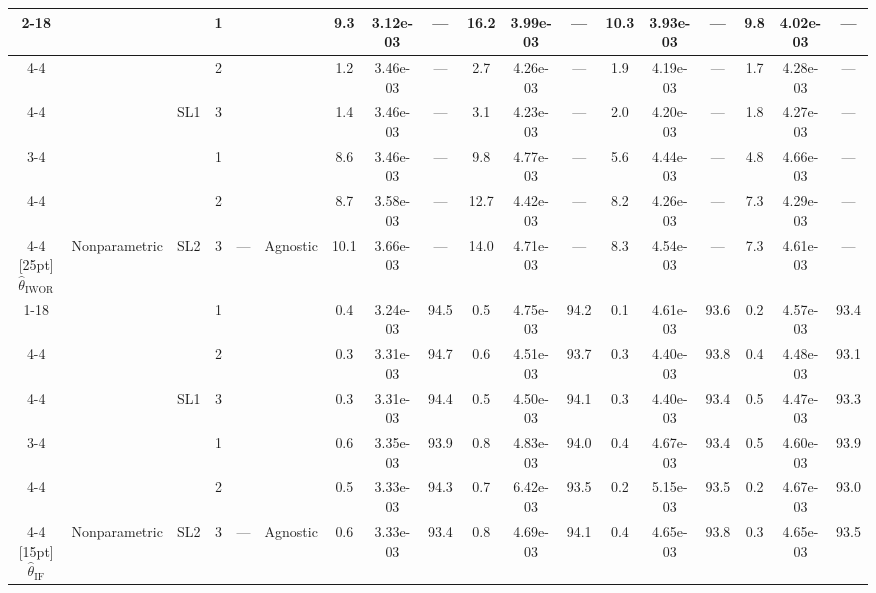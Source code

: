 \begin{table}
\begin{tabular}[t]{ccccccc@{}c@{}cc@{}c@{}cc@{}c@{}cc@{}c@{}c}
\cmidrule{2-18}
 &  &  &  1 &  &  & 9.3 & 3.12e-03 & --- & 16.2 & 3.99e-03 & --- & 10.3 & 3.93e-03 & --- & 9.8 & 4.02e-03 & ---\\
\cmidrule{4-4}
\cmidrule{7-18}
 &  &  &  2 &  &  & 1.2 & 3.46e-03 & --- & 2.7 & 4.26e-03 & --- & 1.9 & 4.19e-03 & --- & 1.7 & 4.28e-03 & ---\\
\cmidrule{4-4}
\cmidrule{7-18}
 &  & \multirow{-3}{*}[5pt]{\centering\arraybackslash SL1} &  3 &  &  & 1.4 & 3.46e-03 & --- & 3.1 & 4.23e-03 & --- & 2.0 & 4.20e-03 & --- & 1.8 & 4.27e-03 & ---\\
\cmidrule{3-4}
\cmidrule{7-18}
 &  &  &  1 &  &  & 8.6 & 3.46e-03 & --- & 9.8 & 4.77e-03 & --- & 5.6 & 4.44e-03 & --- & 4.8 & 4.66e-03 & ---\\
\cmidrule{4-4}
\cmidrule{7-18}
 &  &  &  2 &  &  & 8.7 & 3.58e-03 & --- & 12.7 & 4.42e-03 & --- & 8.2 & 4.26e-03 & --- & 7.3 & 4.29e-03 & ---\\
\cmidrule{4-4}
\cmidrule{7-18}
\multirow{-9}{*}[25pt]{\centering\arraybackslash $\widehat\theta_\text{IWOR}$} & \multirow{-6}{*}[15pt]{\centering\arraybackslash  Nonparametric} & \multirow{-3}{*}[5pt]{\centering\arraybackslash SL2} &  3 & \multirow{-6}{*}[15pt]{\centering\arraybackslash  ---} & \multirow{-6}{*}[15pt]{\centering\arraybackslash  Agnostic} & 10.1 & 3.66e-03 & --- & 14.0 & 4.71e-03 & --- & 8.3 & 4.54e-03 & --- & 7.3 & 4.61e-03 & ---\\
\cmidrule{1-18}
 &  &  &  1 &  &  & 0.4 & 3.24e-03 & 94.5 & 0.5 & 4.75e-03 & 94.2 & 0.1 & 4.61e-03 & 93.6 & 0.2 & 4.57e-03 & 93.4\\
\cmidrule{4-4}
\cmidrule{7-18}
 &  &  &  2 &  &  & 0.3 & 3.31e-03 & 94.7 & 0.6 & 4.51e-03 & 93.7 & 0.3 & 4.40e-03 & 93.8 & 0.4 & 4.48e-03 & 93.1\\
\cmidrule{4-4}
\cmidrule{7-18}
 &  & \multirow{-3}{*}[5pt]{\centering\arraybackslash SL1} &  3 &  &  & 0.3 & 3.31e-03 & 94.4 & 0.5 & 4.50e-03 & 94.1 & 0.3 & 4.40e-03 & 93.4 & 0.5 & 4.47e-03 & 93.3\\
\cmidrule{3-4}
\cmidrule{7-18}
 &  &  &  1 &  &  & 0.6 & 3.35e-03 & 93.9 & 0.8 & 4.83e-03 & 94.0 & 0.4 & 4.67e-03 & 93.4 & 0.5 & 4.60e-03 & 93.9\\
\cmidrule{4-4}
\cmidrule{7-18}
 &  &  &  2 &  &  & 0.5 & 3.33e-03 & 94.3 & 0.7 & 6.42e-03 & 93.5 & 0.2 & 5.15e-03 & 93.5 & 0.2 & 4.67e-03 & 93.0\\
\cmidrule{4-4}
\cmidrule{7-18}
\multirow{-6}{*}[15pt]{\centering\arraybackslash $\widehat\theta_\text{IF}$} & \multirow{-6}{*}[15pt]{\centering\arraybackslash  Nonparametric} & \multirow{-3}{*}[5pt]{\centering\arraybackslash SL2} &  3 & \multirow{-6}{*}[15pt]{\centering\arraybackslash  ---} & \multirow{-6}{*}[15pt]{\centering\arraybackslash  Agnostic} & 0.6 & 3.33e-03 & 93.4 & 0.8 & 4.69e-03 & 94.1 & 0.4 & 4.65e-03 & 93.8 & 0.3 & 4.65e-03 & 93.5\\

\end{tabular}
\end{table}
